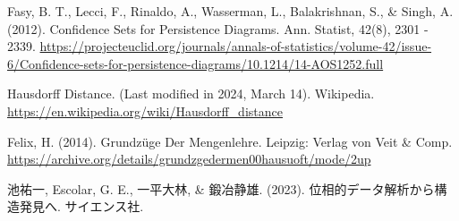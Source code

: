 \documentclass[dvipdfmx,11pt,notheorems]{article}
\begin{document}
\begin{thebibliography}{99}
   Fasy, B. T., Lecci, F., Rinaldo, A., Wasserman, L., Balakrishnan, S., \& Singh, A. (2012). Confidence Sets for Persistence Diagrams. Ann. Statist, 42(8), 2301 - 2339. \url{https://projecteuclid.org/journals/annals-of-statistics/volume-42/issue-6/Confidence-sets-for-persistence-diagrams/10.1214/14-AOS1252.full}

   Hausdorff Distance. (Last modified in 2024, March 14). Wikipedia. \url{https://en.wikipedia.org/wiki/Hausdorff_distance}

   Felix, H. (2014). Grundz\"{u}ge Der Mengenlehre. Leipzig: Verlag von Veit \& Comp. \url{https://archive.org/details/grundzgedermen00hausuoft/mode/2up}

   池祐一, Escolar, G. E., 一平大林, \& 鍛冶静雄. (2023). 位相的データ解析から構造発見へ. サイエンス社.
\end{thebibliography}
\end{document}
